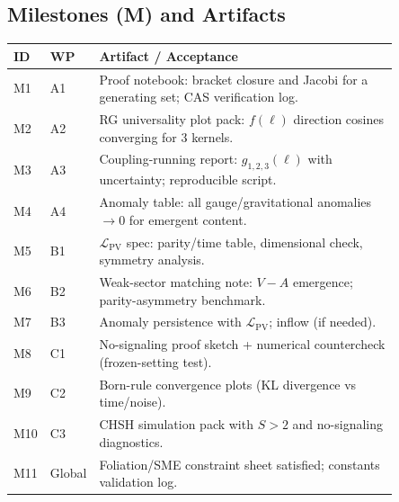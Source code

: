 \documentclass[smallextended]{svjour3}       %
\begin{document}
    \subsection*{Milestones (M) and Artifacts}
    \begin{center}
    \begin{tabular}{llp{0.85\linewidth}}
    \hline
    \textbf{ID} & \textbf{WP} & \textbf{Artifact / Acceptance} \\
    \hline
    M1 & A1 & Proof notebook: bracket closure and Jacobi for a generating set; CAS verification log. \\
    M2 & A2 & RG universality plot pack: $f(\ell)$ direction cosines converging for 3 kernels. \\
    M3 & A3 & Coupling-running report: $g_{1,2,3}(\ell)$ with uncertainty; reproducible script. \\
    M4 & A4 & Anomaly table: all gauge/gravitational anomalies $\to 0$ for emergent content. \\
    M5 & B1 & $\mathcal{L}_{\mathrm{PV}}$ spec: parity/time table, dimensional check, symmetry analysis. \\
    M6 & B2 & Weak-sector matching note: $V\!-\!A$ emergence; parity-asymmetry benchmark. \\
    M7 & B3 & Anomaly persistence with $\mathcal{L}_{\mathrm{PV}}$; inflow (if needed). \\
    M8 & C1 & No-signaling proof sketch + numerical countercheck (frozen-setting test). \\
    M9 & C2 & Born-rule convergence plots (KL divergence vs time/noise). \\
    M10 & C3 & CHSH simulation pack with $S>2$ and no-signaling diagnostics. \\
    M11 & Global & Foliation/SME constraint sheet satisfied; constants validation log. \\
    \hline
    \end{tabular}
    \end{center}


    
    

\appendix
\end{document}

